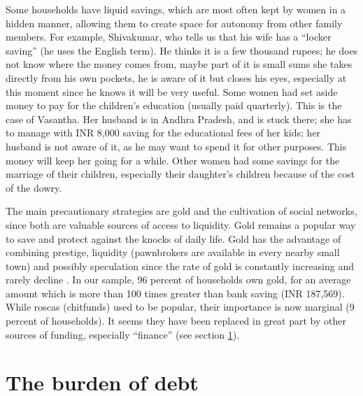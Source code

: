 \documentclass[a4paper, 11pt, onecolumn]{article}
\begin{document}
Some households have liquid savings, which are most often kept by women in a hidden manner, allowing them to create space for autonomy from other family members. 
For example, Shivakumar, who tells us that his wife has a ``locker saving'' (he uses the English term). 
He thinks it is a few thousand rupees; he does not know where the money comes from, maybe part of it is small sums she takes directly from his own pockets, he is aware of it but closes his eyes, especially at this moment since he knows it will be very useful. 
Some women had set aside money to pay for the children's education (usually paid quarterly). 
This is the case of Vasantha. 
Her husband is in Andhra Pradesh, and is stuck there; she has to manage with INR 8,000 saving for the educational fees of her kids; her husband is not aware of it, as he may want to spend it for other purposes. 
This money will keep her going for a while. 
Other women had some savings for the marriage of their children, especially their daughter's children because of the cost of the dowry. 

The main precautionary strategies are gold and the cultivation of social networks, since both are valuable sources of access to liquidity. 
Gold remains a popular way to save and protect against the knocks of daily life. 
Gold has the advantage of combining prestige, liquidity (pawnbrokers are available in every nearby small town) and possibly speculation since the rate of gold is constantly increasing and rarely decline \citep{Goedecke2017}. 
In our sample, 96 percent of households own gold, for an average amount which is more than 100 times greater than bank saving (INR 187,569). 
While roscas (chitfunds) used to be popular, their importance is now marginal (9 percent of households). 
It seems they have been replaced in great part by other sources of funding, especially ``finance'' (see section \ref{section:burden}). 














\section{The burden of debt}
\label{section:burden}
\end{document}
